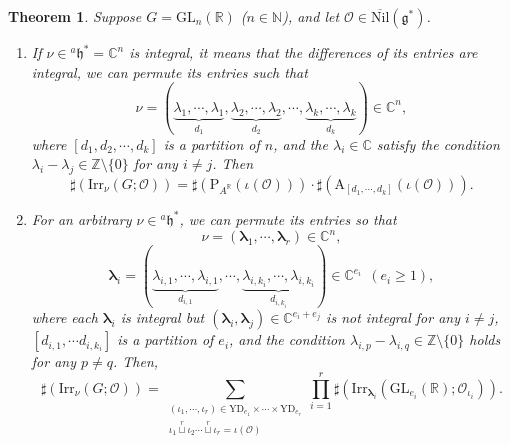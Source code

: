 \documentclass[12pt, a4paper]{amsart}
\numberwithin{equation}{section}
\newtheorem{thm}{Theorem}[section]
\newcommand{\blam}{{\boldsymbol{\lambda}}}
\newcommand{\BC}{{\mathbb {C}}}
\newcommand{\BN}{{\mathbb {N}}}
\newcommand{\BR}{{\mathbb {R}}}
\newcommand{\BZ}{{\mathbb {Z}}}
\newcommand{\CO}{{\mathcal {O}}}
\newcommand{\RA}{{\mathrm {A}}}
\newcommand{\fg}{\mathfrak{g}}
\newcommand{\fh}{\mathfrak{h}}
\newcommand{\GL}{{\mathrm{GL}}}
\newcommand{\Irr}{{\mathrm{Irr}}}
\newcommand{\Nil}{{\mathrm{Nil}}}
\renewcommand{\bar}{\overline}
\begin{document}
\begin{thm}\label{R}
   Suppose $G = \GL_n(\BR)$ ($n \in \BN$), and let $\CO \in \bar{\Nil}(\fg^*)$.
   \begin{enumerate}
        \item If $\nu \in {^{a}\fh^*} = \BC^n$ is integral, it means that the differences of its entries are integral, we can permute its entries such that 
        \[
        \nu = (\underbrace{\lambda_1, \cdots, \lambda_1}_{d_1}, \underbrace{\lambda_2, \cdots, \lambda_2}_{d_2}, \cdots, \underbrace{\lambda_k, \cdots, \lambda_k}_{d_k}) \in \BC^n,
        \]
        where $[d_1, d_2, \cdots , d_k]$ is a partition of $n$, and the $\lambda_i \in \BC$ satisfy the condition $\lambda_i - \lambda_j \in \BZ \setminus \{0\}$ for any $i \neq j$. Then
        \begin{equation}
            \sharp(\Irr_\nu(G;\CO)) = \sharp(\mathrm{P}_{A^{\BR}}(\iota(\CO)))\cdot \sharp(\RA_{[d_1,\cdots,d_k]}(\iota(\CO))).
        \end{equation}
        \item For an arbitrary $\nu \in {^{a}\fh}^*$, we can permute its entries so that 
        \[
        \nu = (\blam_1, \cdots, \blam_r) \in \BC^n,
        \]
        \[
        \blam_i = (\underbrace{\lambda_{i,1}, \cdots, \lambda_{i,1}}_{d_{i,1}}, \cdots, \underbrace{\lambda_{i,k_i}, \cdots, \lambda_{i,k_i}}_{d_{i,k_i}}) \in \BC^{e_i} \ \ (e_i \geq 1),
        \]  
        where each $\blam_i$ is integral but $(\blam_i,\blam_j) \in \BC^{e_i+e_j}$ is not integral for any $i \neq j$, $[d_{i,1}, \cdots d_{i,k_i} ]$ is a partition of $e_i$, and the condition $\lambda_{i,p} - \lambda_{i,q} \in \BZ \setminus \{0\}$ holds for any $p \neq q$. Then,
        \begin{equation}
            \sharp(\Irr_{\nu}(G;\CO)) = \sum_{\substack{(\iota_1,\cdots,\iota_r) \in \mathrm{YD}_{e_1} \times \cdots \times \mathrm{YD}_{e_r} \\ \iota_1 \mathop{\sqcup}\limits^r \iota_2 \cdots \mathop{\sqcup}\limits^r  \iota_r = \iota(\CO) }}\prod_{i=1}^{r}\sharp(\Irr_{\blam_i}(\GL_{e_i}(\BR);\CO_{\iota_i})).
        \end{equation}
    \end{enumerate}
\end{thm}
\end{document}

